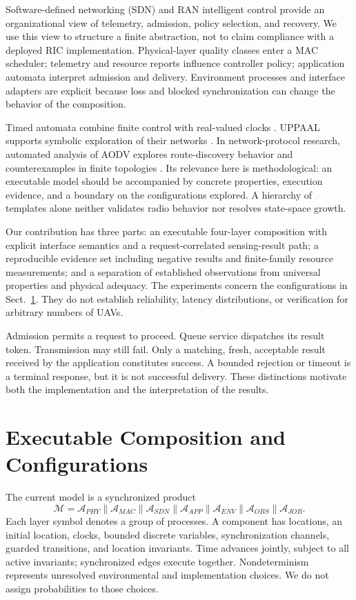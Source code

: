 \documentclass[runningheads]{llncs}
\newcommand{\A}[1]{\mathcal{A}_{#1}}
\begin{document}
Software-defined networking (SDN) and RAN intelligent control provide an organizational view of telemetry, admission, policy selection, and recovery. We use this view to structure a finite abstraction, not to claim compliance with a deployed RIC implementation. Physical-layer quality classes enter a MAC scheduler; telemetry and resource reports influence controller policy; application automata interpret admission and delivery. Environment processes and interface adapters are explicit because loss and blocked synchronization can change the behavior of the composition.

Timed automata combine finite control with real-valued clocks \cite{alur_theory_1994}. UPPAAL supports symbolic exploration of their networks \cite{uppaal_tutorial_2004}. In network-protocol research, automated analysis of AODV explores route-discovery behavior and counterexamples in finite topologies \cite{aodv_uppaal_2012}. Its relevance here is methodological: an executable model should be accompanied by concrete properties, execution evidence, and a boundary on the configurations explored. A hierarchy of templates alone neither validates radio behavior nor resolves state-space growth.

Our contribution has three parts: an executable four-layer composition with explicit interface semantics and a request-correlated sensing-result path; a reproducible evidence set including negative results and finite-family resource measurements; and a separation of established observations from universal properties and physical adequacy. The experiments concern the configurations in Sect.~\ref{sec:configuration}. They do not establish reliability, latency distributions, or verification for arbitrary numbers of UAVs.

Admission permits a request to proceed. Queue service dispatches its result token. Transmission may still fail. Only a matching, fresh, acceptable result received by the application constitutes success. A bounded rejection or timeout is a terminal response, but it is not successful delivery. These distinctions motivate both the implementation and the interpretation of the results.

\section{Executable Composition and Configurations}\label{sec:configuration}
The current model is a synchronized product
\begin{equation}
\mathcal{M}=\A{PHY}\parallel\A{MAC}\parallel\A{SDN}\parallel\A{APP}\parallel\A{ENV}\parallel\A{OBS}\parallel\A{JOB}.
\label{eq:composition}
\end{equation}
Each layer symbol denotes a group of processes. A component has locations, an initial location, clocks, bounded discrete variables, synchronization channels, guarded transitions, and location invariants. Time advances jointly, subject to all active invariants; synchronized edges execute together. Nondeterminism represents unresolved environmental and implementation choices. We do not assign probabilities to those choices.
\end{document}
